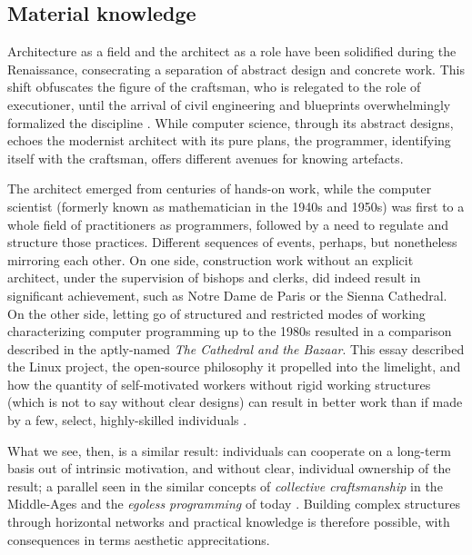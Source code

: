 \subsection{Material knowledge}
\label{subsec:material-knoweldge}

Architecture as a field and the architect as a role have been solidified during the Renaissance, consecrating a separation of abstract design and concrete work. This shift obfuscates the figure of the craftsman, who is relegated to the role of executioner, until the arrival of civil engineering and blueprints overwhelmingly formalized the discipline \citep{pevsner_term_1942}. While computer science, through its abstract designs, echoes the modernist architect with its pure plans, the programmer, identifying itself with the craftsman, offers different avenues for knowing artefacts.

The architect emerged from centuries of hands-on work, while the computer scientist (formerly known as mathematician in the 1940s and 1950s) was first to a whole field of practitioners as programmers, followed by a need to regulate and structure those practices. Different sequences of events, perhaps, but nonetheless mirroring each other. On one side, construction work without an explicit architect, under the supervision of bishops and clerks, did indeed result in significant achievement, such as Notre Dame de Paris or the Sienna Cathedral. On the other side, letting go of structured and restricted modes of working characterizing computer programming up to the 1980s resulted in a comparison described in the aptly-named \emph{The Cathedral and the Bazaar}. This essay described the Linux project, the open-source philosophy it propelled into the limelight, and how the quantity of self-motivated workers without rigid working structures (which is not to say without clear designs) can result in better work than if made by a few, select, highly-skilled individuals \citep{raymond_cathedral_2001,henningsen_joys_2020}.

What we see, then, is a similar result: individuals can cooperate on a long-term basis out of intrinsic motivation, and without clear, individual ownership of the result; a parallel seen in the similar concepts of \emph{collective craftsmanship} in the Middle-Ages and the \emph{egoless programming} of today \citep{brooksjr_mythical_1975}. Building complex structures through horizontal networks and practical knowledge is therefore possible, with consequences in terms aesthetic apprecitations.

